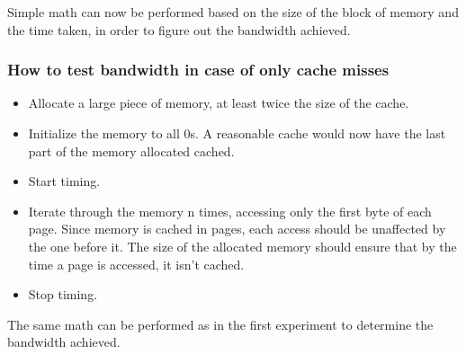 \documentclass[11pt,a4paper]{article}
\begin{document}
Simple math can now be performed based on the size of the block of memory and
the time taken, in order to figure out the bandwidth achieved.

\subsubsection{How to test bandwidth in case of only cache misses}
\begin{itemize}
    \item Allocate a large piece of memory, at least twice the size of the cache.
    \item Initialize the memory to all 0s. A reasonable cache would now have the last part of the memory allocated cached. 
    \item Start timing.
    \item Iterate through the memory n times, accessing only the first byte
          of each page. Since memory is cached in pages, each access should be
          unaffected by the one before it. The size of the allocated memory should
          ensure that by the time a page is accessed, it isn't cached.
    \item Stop timing.
\end{itemize}

The same math can be performed as in the first experiment to determine the
bandwidth achieved.
\end{document}
